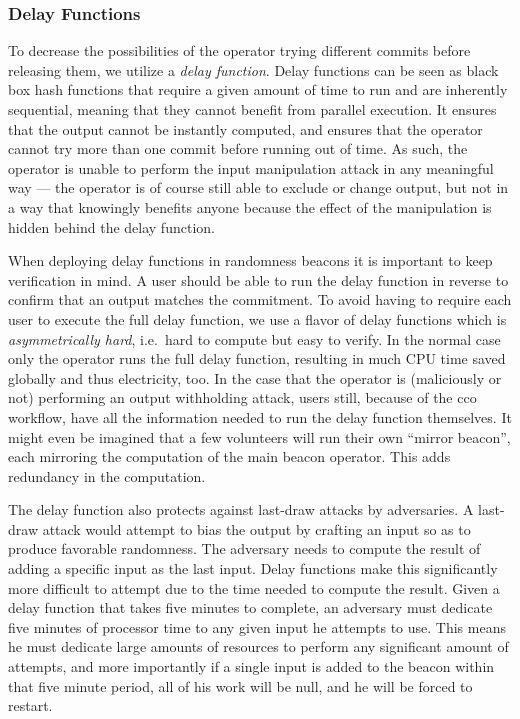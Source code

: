 \subsubsection{Delay Functions}
To decrease the possibilities of the operator trying different commits before releasing them, we utilize a \emph{delay function}.
Delay functions can be seen as black box hash functions that require a given amount of time to run and are inherently sequential, meaning that they cannot benefit from parallel execution.
It ensures that the output cannot be instantly computed, and ensures that the operator cannot try more than one commit before running out of time. As such, the operator is unable to perform the input manipulation attack in any meaningful way --- the operator is of course still able to exclude or change output, but not in a way that knowingly benefits anyone because the effect of the manipulation is hidden behind the delay function.

When deploying delay functions in randomness beacons it is important to keep verification in mind.
A user should be able to run the delay function in reverse to confirm that an output matches the commitment.
To avoid having to require each user to execute the full delay function, we use a flavor of delay functions which is \emph{asymmetrically hard}, i.e.\ hard to compute but easy to verify.
In the normal case only the operator runs the full delay function, resulting in much CPU time saved globally and thus electricity, too.
In the case that the operator is (maliciously or not) performing an output withholding attack, users still, because of the \gls{cco} workflow, have all the information needed to run the delay function themselves.
It might even be imagined that a few volunteers will run their own \enquote{mirror beacon}, each mirroring the computation of the main beacon operator. This adds redundancy in the computation.

The delay function also protects against last-draw attacks by adversaries.
A last-draw attack would attempt to bias the output by crafting an input so as to produce favorable randomness.
The adversary needs to compute the result of adding a specific input as the last input.
Delay functions make this significantly more difficult to attempt due to the time needed to compute the result.
Given a delay function that takes five minutes to complete, an adversary must dedicate five minutes of processor time to any given input he attempts to use.
This means he must dedicate large amounts of resources to perform any significant amount of attempts, and more importantly if a single input is added to the beacon within that five minute period, all of his work will be null, and he will be forced to restart.

